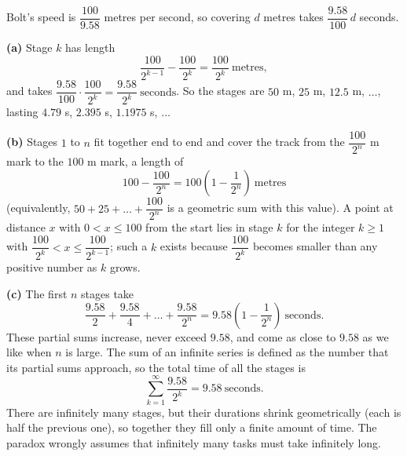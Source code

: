 Bolt's speed is $\dfrac{100}{9.58}$ metres per second, so covering $d$ metres takes $\dfrac{9.58}{100}\,d$ seconds.

\textbf{(a)} Stage $k$ has length
\[\dfrac{100}{2^{k-1}}-\dfrac{100}{2^k}=\dfrac{100}{2^k}\ \text{metres},\]
and takes $\dfrac{9.58}{100}\cdot\dfrac{100}{2^k}=\boxed{\dfrac{9.58}{2^k}\ \text{seconds}}$. So the stages are $50$ m, $25$ m, $12.5$ m, $\dots$, lasting $4.79$ s, $2.395$ s, $1.1975$ s, $\dots$

\textbf{(b)} Stages $1$ to $n$ fit together end to end and cover the track from the $\dfrac{100}{2^n}$ m mark to the $100$ m mark, a length of
\[100-\dfrac{100}{2^n}=100\left(1-\dfrac{1}{2^n}\right)\ \text{metres}\]
(equivalently, $50+25+\dots+\dfrac{100}{2^n}$ is a geometric sum with this value). A point at distance $x$ with $0<x\le100$ from the start lies in stage $k$ for the integer $k\ge1$ with $\dfrac{100}{2^k}<x\le\dfrac{100}{2^{k-1}}$; such a $k$ exists because $\dfrac{100}{2^k}$ becomes smaller than any positive number as $k$ grows.

\textbf{(c)} The first $n$ stages take
\[\dfrac{9.58}{2}+\dfrac{9.58}{4}+\dots+\dfrac{9.58}{2^n}=9.58\left(1-\dfrac{1}{2^n}\right)\ \text{seconds}.\]
These partial sums increase, never exceed $9.58$, and come as close to $9.58$ as we like when $n$ is large. The sum of an infinite series is defined as the number that its partial sums approach, so the total time of all the stages is
\[\sum_{k=1}^{\infty}\dfrac{9.58}{2^k}=\boxed{9.58\ \text{seconds}}.\]
There are infinitely many stages, but their durations shrink geometrically (each is half the previous one), so together they fill only a finite amount of time. The paradox wrongly assumes that infinitely many tasks must take infinitely long.
